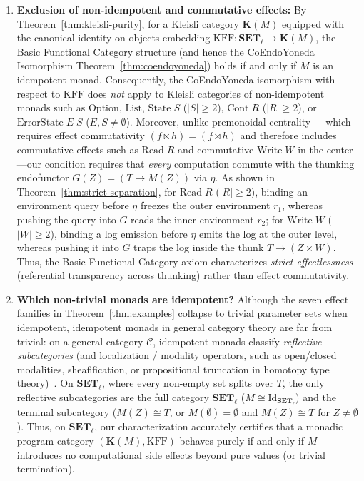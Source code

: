 \documentclass[11pt,a4paper]{article}
\theoremstyle{definition}
\theoremstyle{remark}
\newcommand{\Set}{\mathbf{SET}}
\newcommand{\Id}{\mathrm{Id}}
\newcommand{\KFF}{\mathrm{KFF}}
\newcommand{\K}{\mathbf{K}}
\begin{document}
\begin{enumerate}[label=(\arabic*),nosep]
  \item \textbf{Exclusion of non-idempotent and commutative effects:}
  By Theorem~\ref{thm:kleisli-purity}, for a Kleisli category $\K(M)$ equipped with the canonical
  identity-on-objects embedding $\KFF : \Set_\ell \to \K(M)$, the Basic Functional Category structure
  (and hence the CoEndoYoneda Isomorphism Theorem~\ref{thm:coendoyoneda}) holds if and only if $M$ is an
  idempotent monad. Consequently, the CoEndoYoneda isomorphism with respect to $\KFF$ does \emph{not}
  apply to Kleisli categories of non-idempotent monads such as $\mathrm{Option}$, $\mathrm{List}$,
  $\mathrm{State}\;S$ ($|S| \ge 2$), $\mathrm{Cont}\;R$ ($|R| \ge 2$), or $\mathrm{ErrorState}\;E\;S$
  ($E, S \neq \emptyset$). Moreover, unlike premonoidal centrality~\cite{PowerRobinson1997,LevyPowerThielecke2003}---which
  requires effect commutativity $(f \ltimes h) = (f \rtimes h)$ and therefore includes commutative
  effects such as $\mathrm{Read}\;R$ and commutative $\mathrm{Write}\;W$ in the center---our condition
  requires that \emph{every} computation commute with the thunking endofunctor $G(Z) = (T \to M(Z))$ via
  $\eta$. As shown in Theorem~\ref{thm:strict-separation}, for $\mathrm{Read}\;R$ ($|R| \ge 2$),
  binding an environment query before $\eta$ freezes the outer environment $r_1$, whereas pushing the
  query into $G$ reads the inner environment $r_2$; for $\mathrm{Write}\;W$ ($|W| \ge 2$), binding a log
  emission before $\eta$ emits the log at the outer level, whereas pushing it into $G$ traps the log
  inside the thunk $T \to (Z \times W)$. Thus, the Basic Functional Category axiom characterizes
  \emph{strict effectlessness} (referential transparency across thunking) rather than effect
  commutativity.

  \vspace{3pt}
  \item \textbf{Which non-trivial monads are idempotent?}
  Although the seven effect families in Theorem~\ref{thm:examples} collapse to trivial parameter sets
  when idempotent, idempotent monads in general category theory are far from trivial: on a general
  category $\mathcal{C}$, idempotent monads classify \emph{reflective subcategories} (and localization /
  modality operators, such as open/closed modalities, sheafification, or propositional truncation in
  homotopy type theory)~\cite{Borceux1994,Kelly1980,nLabIdempotentMonad}. On $\Set_\ell$, where every
  non-empty set splits over $T$, the only reflective subcategories are the full category $\Set_\ell$
  ($M \cong \Id_{\Set_\ell}$) and the terminal subcategory ($M(Z) \cong T$, or $M(\emptyset) = \emptyset$
  and $M(Z) \cong T$ for $Z \neq \emptyset$). Thus, on $\Set_\ell$, our characterization accurately
  certifies that a monadic program category $(\K(M), \KFF)$ behaves purely if and only if $M$ introduces
  no computational side effects beyond pure values (or trivial termination).


\end{enumerate}
\end{document}
